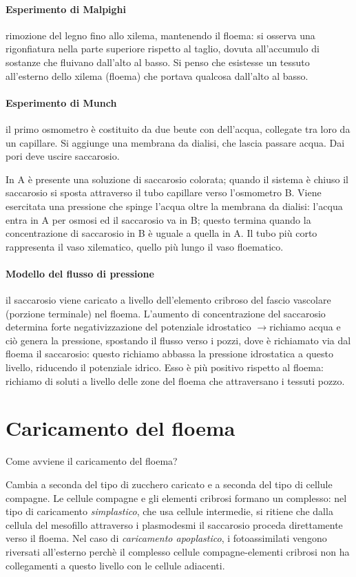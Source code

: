 \documentclass[a4paper,12pt]{book}
\newcommand{\lfreccia}{\ensuremath{\longrightarrow}}
\begin{document}
\paragraph{Esperimento di Malpighi} rimozione del legno fino allo xilema, mantenendo il floema: si osserva una rigonfiatura nella parte superiore rispetto al taglio, dovuta all'accumulo di sostanze che fluivano dall'alto al basso. Si penso che esistesse un tessuto all'esterno dello xilema (floema) che portava qualcosa dall'alto al basso.

\paragraph{Esperimento di Munch} il primo osmometro è costituito da due beute con dell'acqua, collegate tra loro da un capillare. Si aggiunge una membrana da dialisi, che lascia passare acqua. Dai pori deve uscire saccarosio. 

In A è presente una soluzione di saccarosio colorata; quando il sistema è chiuso il saccarosio si sposta attraverso il tubo capillare verso l'osmometro B. Viene esercitata una pressione che spinge l'acqua oltre la membrana da dialisi: l'acqua entra in A per osmosi ed il saccarosio va in B; questo termina quando la concentrazione di saccarosio in B è uguale a quella in A. Il tubo più corto rappresenta il vaso xilematico, quello più lungo il vaso floematico.

\paragraph{Modello del flusso di pressione} il saccarosio viene caricato a livello dell'elemento cribroso del fascio vascolare (porzione terminale) nel floema. L'aumento di concentrazione del saccarosio determina forte negativizzazione del potenziale idrostatico \lfreccia richiamo acqua e ciò genera la pressione, spostando il flusso verso i pozzi, dove è richiamato via dal floema il saccarosio: questo richiamo abbassa la pressione idrostatica a questo livello, riducendo il potenziale idrico. Esso è più positivo rispetto al floema: richiamo di soluti a livello delle zone del floema che attraversano i tessuti pozzo.

\section{Caricamento del floema}
Come avviene il caricamento del floema?

Cambia a seconda del tipo di zucchero caricato e a seconda del tipo di cellule compagne. Le cellule compagne e gli elementi cribrosi formano un complesso: nel tipo di caricamento \emph{simplastico}, che usa cellule intermedie, si ritiene che dalla cellula del mesofillo attraverso i plasmodesmi il saccarosio proceda direttamente verso il floema. Nel caso di \emph{caricamento apoplastico}, i fotoassimilati vengono riversati all'esterno perchè il complesso cellule compagne-elementi cribrosi non ha collegamenti a questo livello con le cellule adiacenti.
\end{document}
